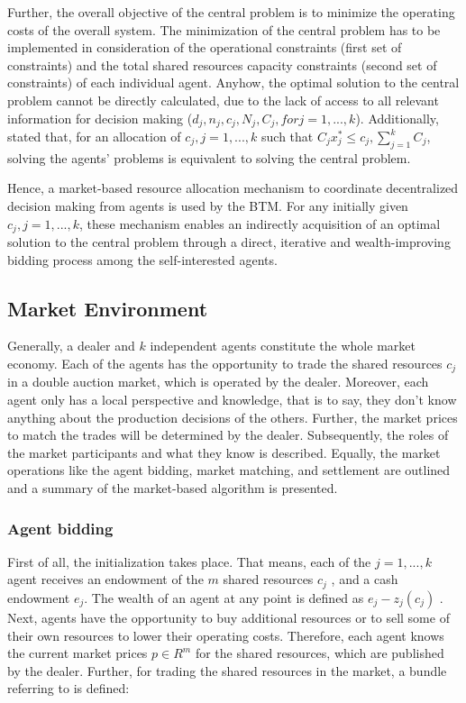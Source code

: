 Further, the overall objective of the central problem is to minimize the operating costs of the overall system. The minimization of the central problem
has to be implemented in consideration of the operational constraints 
(first set of constraints) and the total shared resources capacity constraints (second set of constraints) of each individual agent. 
Anyhow, the optimal solution to the central problem cannot be directly calculated, 
due to the lack of access to all relevant information for decision making
($d_{j}, n_{j}, c_{j}, N_{j}, C_{j}, for j=1, ..., k$). 
Additionally,  stated that, for an allocation of 
$c_{j}, j=1, ..., k$ such that $C_{j}x_{j}^{*} \leq c_{j}, \sum\limits_{j=1}^{k} C_{j}$, 
solving the agents’ problems is equivalent to solving the central problem.

Hence, a market-based resource allocation mechanism to coordinate decentralized
decision making from agents is used by the BTM. 
For any initially given $c_{j}, j=1, ..., k$, these mechanism enables an indirectly
acquisition of an optimal solution to the central problem through a direct, iterative and
wealth-improving bidding process among the self-interested agents. 


\subsection{Market Environment}
Generally, a dealer and $k$ independent agents constitute the whole market economy. 
Each of the agents has the opportunity to trade the shared resources $c_{j}$ 
in a double auction market, which is operated by the dealer. Moreover, each agent only has a local perspective and knowledge, that is to say, they don't know anything about the production decisions of the others. 
Further, the market prices to match the trades will be determined by the dealer.
Subsequently, the roles of the market participants and what they know is described. 
Equally, the market operations like the agent bidding, market matching, and settlement are outlined and a summary of the market-based algorithm is presented. 

\subsubsection{Agent bidding}
\label{sec:agent_bidding}
First of all, the initialization takes place. That means, each of the $j=1, ..., k$ agent receives an
endowment of the $m$ shared resources $c_{j}$ , and a cash endowment $e_{j}$.
The wealth of an agent at any point is defined as $e_{j} - z_{j}(c_{j})$ .
Next, agents have the opportunity to buy additional resources or to sell some of their own resources to lower their operating costs. 
Therefore, each agent knows the current market prices $p \in R^{m}$ for the shared resources, 
which are published by the dealer. Further, for trading the shared resources in the market, 
a bundle referring to  is defined:

